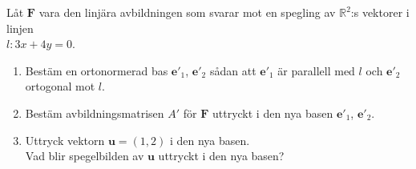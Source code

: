 \documentclass[11pt]{article}
\begin{document}
Låt $\mathbf{F}$ vara den linjära avbildningen som svarar mot en spegling av $\mathbb{R}^2$:s vektorer i linjen\\
$l : 3x + 4y = 0$.
\begin{enumerate}[label=(\alph*)]
    \item Bestäm en ortonormerad bas $\mathbf{e}'_1$, $\mathbf{e}'_2$ sådan att $\mathbf{e}'_1$ är parallell med $l$ och $\mathbf{e}'_2$ ortogonal mot $l$.
    \item Bestäm avbildningsmatrisen $A'$ för $\mathbf{F}$ uttryckt i den nya basen $\mathbf{e}'_1$, $\mathbf{e}'_2$.
    \item Uttryck vektorn $\mathbf{u} = (1, 2)$ i den nya basen.\\
        Vad blir spegelbilden av $\mathbf{u}$ uttryckt i den nya basen?
\end{enumerate}
\end{document}
